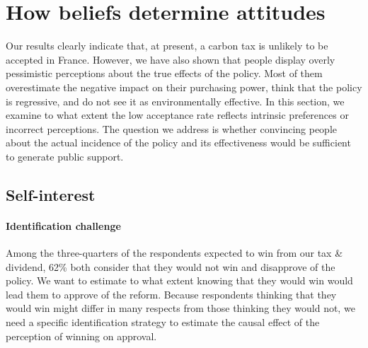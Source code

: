 \documentclass[12pt]{article} %
\begin{document}
\section{How beliefs determine attitudes \label{sec:motives5}}

Our results clearly indicate that, at present, a carbon tax is unlikely to be accepted in France. However, we have also shown that people display overly pessimistic perceptions about the true effects of the policy. Most of them overestimate the negative impact on their purchasing power, think that the policy is regressive, and do not see it as environmentally effective. In this section, we examine to what extent the low acceptance rate reflects intrinsic preferences or incorrect perceptions. The question we address is whether convincing people about the actual incidence of the policy and its effectiveness would be sufficient to generate public support.

\subsection{Self-interest \label{sec:motive_si}}

\paragraph{Identification challenge}

Among the three-quarters of the respondents expected to win from our tax \& dividend, 62\% both consider that they would not win and disapprove of the policy. We want to estimate to what extent knowing that they would win would lead them to approve of the reform. Because respondents thinking that they would win might differ in many respects from those thinking they would not, we need a specific identification strategy to estimate the causal effect of the perception of winning on approval.
\end{document}

